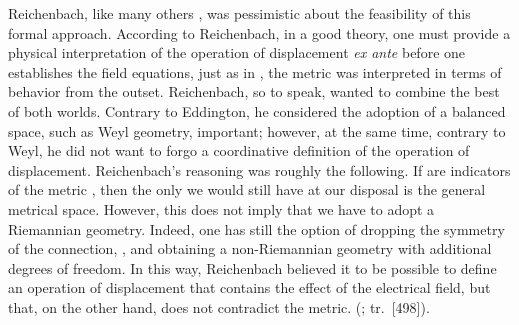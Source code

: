 \documentclass[final]{article}
\renewcommand{\rzlap}[2]{(\cite[#1]{Reichenbach1928}; tr.\ [#2])\xspace}
\begin{document}

%


Reichenbach, like many others \citep[\eg][]{Pauli1926}, was pessimistic about the feasibility of this formal approach. According to Reichenbach, in a good theory, one must provide a physical interpretation of the operation of displacement \emph{ex ante} before one establishes the field equations, just as in \gr, the metric was interpreted in terms of \rac behavior from the outset. Reichenbach, so to speak, wanted to combine the best of both worlds. Contrary to Eddington, he considered  the adoption of a balanced space, such as Weyl geometry, important; however, at the same time, contrary to Weyl, he did not want to forgo a coordinative definition of the operation of displacement. Reichenbach's reasoning was roughly the following. If \rac are indicators of the metric \gmn, then the only  we would still have at our disposal is the general metrical space. However, this does not imply that we have to adopt a Riemannian geometry. Indeed, one has still the option of dropping the symmetry of the connection, \asym, and obtaining a non-Riemannian geometry with additional degrees of freedom. In this way, Reichenbach believed it to be possible to define an operation of displacement that contains the effect of the electrical field, but that, on the other hand, does not contradict the metric.  \rzlap{357}{498}. 
\end{document}
